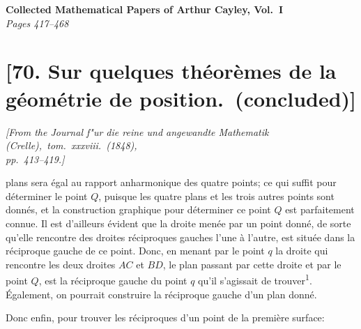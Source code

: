\documentclass[11pt,a4paper]{article}
\theoremstyle{definition}
\begin{document}
\begin{center}
\Large\textbf{Collected Mathematical Papers of Arthur Cayley, Vol.\ I}\\[6pt]
\large\textit{Pages 417--468}
\end{center}

\vspace{1em}

\section*{[70. Sur quelques th\'{e}or\`{e}mes de la g\'{e}om\'{e}trie de position.\ (concluded)]}

\begin{flushright}
\textit{[From the Journal f"{u}r die reine und angewandte Mathematik (Crelle),\ tom.\ xxxviii.\ (1848),\\
pp.\ 413--419.]}
\end{flushright}

\setcounter{page}{417}

plans sera \'{e}gal au rapport anharmonique des quatre points; ce qui suffit pour d\'{e}terminer le point $Q$, puisque les quatre plans et les trois autres points sont donn\'{e}s, et la construction graphique pour d\'{e}terminer ce point $Q$ est parfaitement connue. Il est d'ailleurs \'{e}vident que la droite men\'{e}e par un point donn\'{e}, de sorte qu'elle rencontre des droites r\'{e}ciproques gauches l'une \`{a} l'autre, est situ\'{e}e dans la r\'{e}ciproque gauche de ce point. Donc, en menant par le point $q$ la droite qui rencontre les deux droites $AC$ et $BD$, le plan passant par cette droite et par le point $Q$, est la r\'{e}ciproque gauche du point $q$ qu'il s'agissait de trouver\textsuperscript{1}. \'{E}galement, on pourrait construire la r\'{e}ciproque gauche d'un plan donn\'{e}.

Donc enfin, pour trouver les r\'{e}ciproques d'un point de la premi\`{e}re surface:
\end{document}
